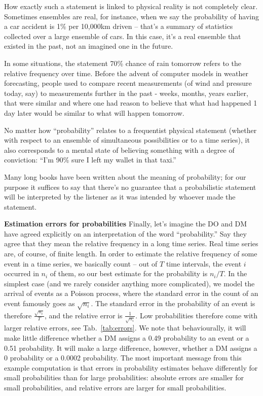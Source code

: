 \documentclass[11pt]{article}
\newcommand{\tref}[1]{Tab.~\ref{tab:#1}}
\newcommand{\subhead}[1]{\mbox{}\newline\textbf{#1}\newline}
\numberwithin{equation}{section}
\begin{document}
How exactly such a statement is linked to physical reality is not completely clear. Sometimes ensembles are real, for instance, when we say the probability of having a car accident is 1\% per 10,000km driven -- that's a summary of statistics collected over a large ensemble of cars. In this case, it's a real ensemble that existed in the past, not an imagined one in the future. 

In some situations, the statement 70\% chance of rain tomorrow refers to the relative frequency over time. Before the advent of computer models in weather forecasting, people used to compare recent measurements (of wind and pressure today, say) to measurements further in the past - weeks, months, years earlier, that were similar and where one had reason to believe that what had happened 1 day later would be similar to what will happen tomorrow.

No matter how ``probability'' relates to a frequentist physical statement (whether with respect to an ensemble of simultaneous possibilities or to a time series), it also corresponds to a mental state of believing something with a degree of conviction: ``I'm 90\% sure I left my wallet in that taxi.''

Many long books have been written about the meaning of probability; for our purpose it suffices to say that there's no guarantee that a probabilistic statement will be interpreted by the listener as it was intended by whoever made the statement.

\subhead{Estimation errors for probabilities}
Finally, let's imagine the DO and DM have agreed explicitly on an interpretation of the word ``probability.'' Say they agree that they mean the relative frequency in a long time series. Real time series are, of course, of finite length. In order to estimate the relative frequency of some event in a time series, we basically count -- out of $T$ time intervals, the event $i$ occurred in $n_i$ of them, so our best estimate for the probability is $n_i/T$. In the simplest case (and we rarely consider anything more complicated), we model the arrival of events as a Poisson process, where the standard error in the count of an event famously goes as $\sqrt{n_i}$. The standard error in the probability of an event is therefore $\frac{\sqrt{n_i}}{T}$, and the relative error is $\frac{1}{\sqrt{n_i}}$. Low probabilities therefore come with larger relative errors, see \tref{errors}. We note that behaviourally, it will make little difference whether a DM assigns a 0.49 probability to an event or a 0.51 probability. It will make a large difference, however, whether a DM assigns a 0 probability or a 0.0002 probability.
The most important message from this example computation is that errors in probability estimates behave differently for small probabilities than for large probabilities: absolute errors are smaller for small probabilities, and relative errors are larger for small probabilities.
\end{document}
